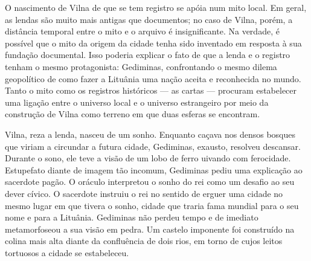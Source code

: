 \asterisc

O nascimento de Vilna de que se tem registro se apóia num mito local. Em
geral, as lendas são muito mais antigas que documentos; no caso de
Vilna, porém, a distância temporal entre o mito e o arquivo é
insignificante. Na verdade, é possível que o mito da origem da cidade
tenha sido inventado em resposta à sua fundação documental. Isso poderia
explicar o fato de que a lenda e o registro tenham o mesmo protagonista:
Gediminas, confrontando o mesmo dilema geopolítico de como fazer a
Lituânia uma nação aceita e reconhecida no mundo. Tanto o mito como os
registros históricos --- as cartas --- procuram estabelecer uma ligação
entre o universo local e o universo estrangeiro por meio da construção
de Vilna como terreno em que duas esferas se encontram.

Vilna, reza a lenda, nasceu de um sonho. Enquanto caçava nos densos
bosques que viriam a circundar a futura cidade, Gediminas, exausto,
resolveu descansar. Durante o sono, ele teve a visão de um lobo de ferro
uivando com ferocidade. Estupefato diante de imagem tão incomum,
Gediminas pediu uma explicação ao sacerdote pagão. O oráculo interpretou
o sonho do rei como um desafio ao seu dever cívico. O sacerdote instruiu
o rei no sentido de erguer uma cidade no mesmo lugar em que tivera o
sonho, cidade que traria fama mundial para o seu nome e para a Lituânia.
Gediminas não perdeu tempo e de imediato metamorfoseou a sua visão em
pedra. Um castelo imponente foi construído na colina mais alta diante da
confluência de dois rios, em torno de cujos leitos tortuosos a cidade se
estabeleceu.

